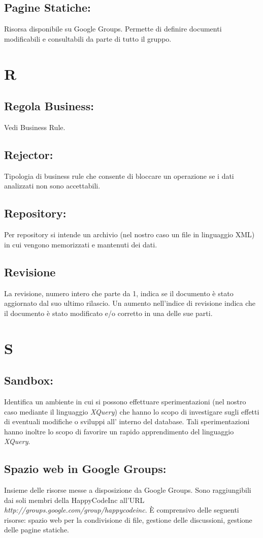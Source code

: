 \documentclass[11pt,titlepage,a4paper]{report}
\begin{document}
\section{Pagine Statiche:}
Risorsa disponibile su Google Groups. Permette di definire documenti modificabili e consultabili da parte di tutto il gruppo.

\chapter{R}
\section{Regola Business:}
Vedi Business Rule.
\section{Rejector:}
Tipologia di business rule che consente di bloccare un operazione se i dati analizzati non sono accettabili.
\section{Repository:} 
Per repository si intende un archivio (nel nostro caso un file in linguaggio XML) in cui vengono memorizzati e mantenuti dei dati.
\section{Revisione}
La revisione, numero intero che parte da 1, indica se il documento \`e stato aggiornato dal suo ultimo rilascio. Un aumento nell'indice di revisione indica che il documento \`e stato modificato e/o corretto in una delle sue parti.

\chapter{S}
\section{Sandbox:}
Identifica un ambiente in cui si possono effettuare sperimentazioni (nel nostro caso mediante il linguaggio \textit{XQuery}) che hanno lo scopo di investigare sugli effetti di eventuali modifiche o sviluppi all' interno del database. Tali sperimentazioni hanno inoltre lo scopo di favorire un rapido apprendimento del linguaggio \textit{XQuery}.
\section{Spazio web in Google Groups:}
Insieme delle risorse messe a disposizione da Google Groups. Sono raggiungibili dai soli membri della HappyCodeInc all'URL\\ \textit{http://groups.google.com/group/happycodeinc}. \`E comprensivo delle seguenti risorse: spazio web per la condivisione di file, gestione delle discussioni, gestione delle pagine statiche.
\end{document}
